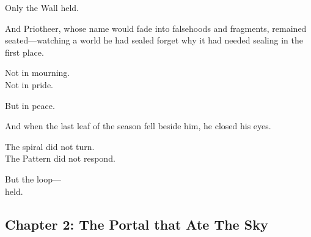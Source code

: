 \documentclass[9pt]{article}
\begin{document}
\vspace{0.5em}
Only the Wall held.

\vspace{0.5em}
And Priotheer, whose name would fade into falsehoods and fragments, remained seated---watching a world he had sealed forget why it had needed sealing in the first place.

\vspace{0.5em}
Not in mourning.\\
Not in pride.

\vspace{0.5em}
But in peace.

\vspace{0.5em}
And when the last leaf of the season fell beside him, he closed his eyes.

\vspace{0.5em}
The spiral did not turn.\\
The Pattern did not respond.

\vspace{0.5em}
But the loop---\\
held.

\newpage

\subsection*{Chapter 2: The Portal that Ate The Sky}

\vspace{1in}
\end{document}
